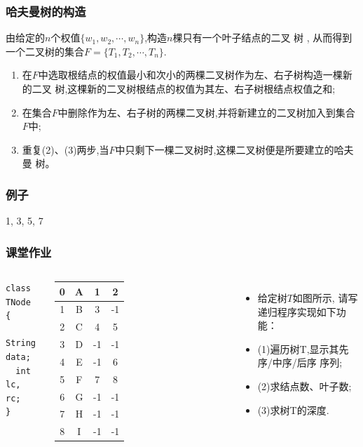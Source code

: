 \begin{frame}[fragile]
  \frametitle{哈夫曼树的构造}

  由给定的$n$个权值$\{w_1, w_2, \cdots, w_n\}$,构造$n$棵只有一个叶子结点的二叉
  树 , 从而得到一个二叉树的集合$F=\{T_1, T_2, \cdots, T_n\}$.

  \begin{enumerate}
  \item 在$F$中选取根结点的权值最小和次小的两棵二叉树作为左、右子树构造一棵新的二叉
    树,这棵新的二叉树根结点的权值为其左、右子树根结点权值之和;
  \item 在集合$F$中删除作为左、右子树的两棵二叉树,并将新建立的二叉树加入到集合
    $F$中;
  \item 重复(2)、(3)两步,当$F$中只剩下一棵二叉树时,这棵二叉树便是所要建立的哈夫曼
    树。
  \end{enumerate}
\end{frame}

\begin{frame}[fragile]
  \frametitle{例子}
  1, 3, 5, 7
\end{frame}

\begin{frame}[fragile]
  \frametitle{课堂作业}
  \begin{columns}

    \begin{verbatim}
class TNode {
  String data;
  int lc, rc;
}
    \end{verbatim}

    \begin{tabular}{| c | c | c | c|}
      \hline
      0 & A & 1 & 2 \\ \hline
      1 & B & 3 & -1 \\ \hline
      2 & C & 4 & 5 \\ \hline
      3 & D & -1 & -1 \\ \hline
      4 & E & -1 & 6 \\ \hline
      5 & F & 7 & 8 \\ \hline
      6 & G & -1 & -1 \\ \hline
      7 & H & -1 & -1 \\ \hline
      8 & I & -1 & -1 \\ \hline
    \end{tabular}

    \begin{itemize}
    \item 给定树$T$如图所示, 请写递归程序实现如下功能：
    \item (1)遍历树T,显示其先序/中序/后序 序列;
    \item (2)求结点数、叶子数;
    \item (3)求树T的深度.
    \end{itemize}
  \end{columns}
\end{frame}

